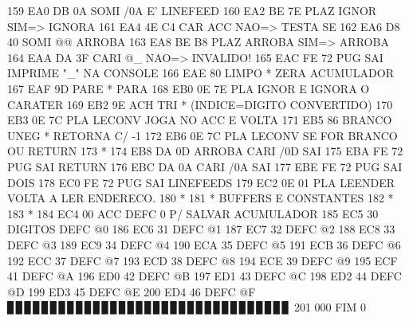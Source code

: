 \documentclass[a4paper,12pt]{article}
\begin{document}
{ 159  EA0 DB 0A          SOMI    /0A     E' LINEFEED
 160  EA2 BE 7E          PLAZ    IGNOR   SIM=> IGNORA
 161  EA4 4E C4          CAR     ACC     NAO=> TESTA SE
 162  EA6 D8 40          SOMI    @@      ARROBA
 163  EA8 BE B8          PLAZ    ARROBA  SIM=> ARROBA
 164  EAA DA 3F          CARI    @_      NAO=> INVALIDO!
 165  EAC FE 72          PUG     SAI     IMPRIME "_" NA CONSOLE
 166  EAE 80             LIMPO   *       ZERA ACUMULADOR
 167  EAF 9D             PARE    *       PARA
 168  EB0 0E 7E          PLA     IGNOR   E IGNORA O CARATER
 169  EB2 9E     ACH     TRI     *       (INDICE=DIGITO CONVERTIDO)
 170  EB3 0E 7C          PLA     LECONV  JOGA NO ACC E VOLTA
 171  EB5 86     BRANCO  UNEG    *       RETORNA C/ -1
 172  EB6 0E 7C          PLA     LECONV  SE FOR BRANCO OU RETURN
 173  *
 174  EB8 DA 0D  ARROBA  CARI    /0D     SAI
 175  EBA FE 72          PUG     SAI     RETURN
 176  EBC DA 0A          CARI    /0A     SAI
 177  EBE FE 72          PUG     SAI     DOIS
 178  EC0 FE 72          PUG     SAI     LINEFEEDS
 179  EC2 0E 01          PLA     LEENDER VOLTA A LER ENDERECO.
 180  *
 181  * BUFFERS E CONSTANTES
 182  *
 183  *
 184  EC4  00    ACC     DEFC    0       P/ SALVAR ACUMULADOR
 185  EC5  30    DIGITOS DEFC    @0
 186  EC6  31            DEFC    @1
 187  EC7  32            DEFC    @2
 188  EC8  33            DEFC    @3
 189  EC9  34            DEFC    @4
 190  ECA  35            DEFC    @5
 191  ECB  36            DEFC    @6
 192  ECC  37            DEFC    @7
 193  ECD  38            DEFC    @8
 194  ECE  39            DEFC    @9
 195  ECF  41            DEFC    @A
 196  ED0  42            DEFC    @B
 197  ED1  43            DEFC    @C
 198  ED2  44            DEFC    @D
 199  ED3  45            DEFC    @E
 200  ED4  46            DEFC    @F
▊▊▊▊▊▊▊▊▊▊▊▊▊▊▊▊▊▊▊▊▊▊▊▊▊▊▊▊▊▊▊▊▊ 201  000                FIM      0
}
\end{document}
